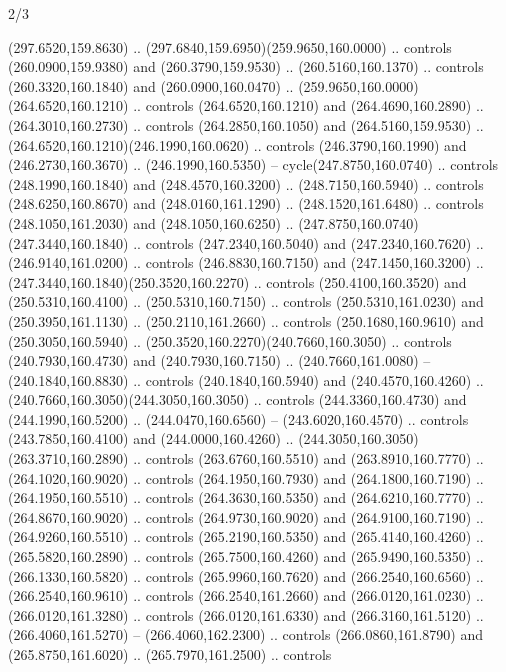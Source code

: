 \begin{flagdescription}{2/3}
\begin{scope}[xshift=0.5\flaglength,yshift=0.5\flagwidth,scale=\flagwidth/259.2]
\begin{scope}[y=0.8pt, x=0.8pt, yscale=-1,shift={(-243,-162)}]
      (297.6520,159.8630) .. (297.6840,159.6950)(259.9650,160.0000) .. controls
      (260.0900,159.9380) and (260.3790,159.9530) .. (260.5160,160.1370) .. controls
      (260.3320,160.1840) and (260.0900,160.0470) ..
      (259.9650,160.0000)(264.6520,160.1210) .. controls (264.6520,160.1210) and
      (264.4690,160.2890) .. (264.3010,160.2730) .. controls (264.2850,160.1050) and
      (264.5160,159.9530) .. (264.6520,160.1210)(246.1990,160.0620) .. controls
      (246.3790,160.1990) and (246.2730,160.3670) .. (246.1990,160.5350) --
      cycle(247.8750,160.0740) .. controls (248.1990,160.1840) and
      (248.4570,160.3200) .. (248.7150,160.5940) .. controls (248.6250,160.8670) and
      (248.0160,161.1290) .. (248.1520,161.6480) .. controls (248.1050,161.2030) and
      (248.1050,160.6250) .. (247.8750,160.0740)(247.3440,160.1840) .. controls
      (247.2340,160.5040) and (247.2340,160.7620) .. (246.9140,161.0200) .. controls
      (246.8830,160.7150) and (247.1450,160.3200) ..
      (247.3440,160.1840)(250.3520,160.2270) .. controls (250.4100,160.3520) and
      (250.5310,160.4100) .. (250.5310,160.7150) .. controls (250.5310,161.0230) and
      (250.3950,161.1130) .. (250.2110,161.2660) .. controls (250.1680,160.9610) and
      (250.3050,160.5940) .. (250.3520,160.2270)(240.7660,160.3050) .. controls
      (240.7930,160.4730) and (240.7930,160.7150) .. (240.7660,161.0080) --
      (240.1840,160.8830) .. controls (240.1840,160.5940) and (240.4570,160.4260) ..
      (240.7660,160.3050)(244.3050,160.3050) .. controls (244.3360,160.4730) and
      (244.1990,160.5200) .. (244.0470,160.6560) -- (243.6020,160.4570) .. controls
      (243.7850,160.4100) and (244.0000,160.4260) ..
      (244.3050,160.3050)(263.3710,160.2890) .. controls (263.6760,160.5510) and
      (263.8910,160.7770) .. (264.1020,160.9020) .. controls (264.1950,160.7930) and
      (264.1800,160.7190) .. (264.1950,160.5510) .. controls (264.3630,160.5350) and
      (264.6210,160.7770) .. (264.8670,160.9020) .. controls (264.9730,160.9020) and
      (264.9100,160.7190) .. (264.9260,160.5510) .. controls (265.2190,160.5350) and
      (265.4140,160.4260) .. (265.5820,160.2890) .. controls (265.7500,160.4260) and
      (265.9490,160.5350) .. (266.1330,160.5820) .. controls (265.9960,160.7620) and
      (266.2540,160.6560) .. (266.2540,160.9610) .. controls (266.2540,161.2660) and
      (266.0120,161.0230) .. (266.0120,161.3280) .. controls (266.0120,161.6330) and
      (266.3160,161.5120) .. (266.4060,161.5270) -- (266.4060,162.2300) .. controls
      (266.0860,161.8790) and (265.8750,161.6020) .. (265.7970,161.2500) .. controls

\end{scope}
\end{scope}
\end{flagdescription}
